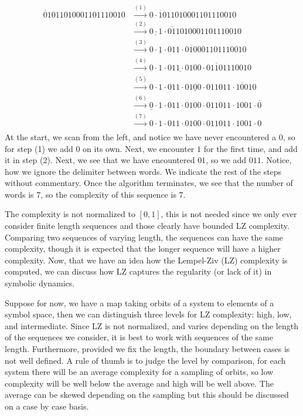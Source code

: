 \begin{align*}
\overline{0}1011010001101110010
&\xrightarrow{(1)}0\cdot\overline{1}011010001101110010 \\
&\xrightarrow{(2)}\underline{0\cdot1}\cdot\overline{01}1010001101110010 \\
&\xrightarrow{(3)}\underline{0\cdot1\cdot0}11\cdot\overline{010}001101110010 \\
&\xrightarrow{(4)}0\cdot1\cdot\underline{011\cdot01}00\cdot\overline{01101}110010 \\
&\xrightarrow{(5)}0\cdot1\cdot011\cdot0\underline{100}\cdot011011\cdot\overline{100}10 \\
&\xrightarrow{(6)}\underline{0}\cdot1\cdot011\cdot0100\cdot011011\cdot1001\cdot\overline{0} \\
&\xrightarrow{(7)}0\cdot1\cdot011\cdot0100\cdot011011\cdot1001\cdot0 \\
\end{align*}
At the start, we scan from the left, and notice we have never encountered a $0$, so for step (1) we add $0$ on its own. Next, we encounter $1$ for the first time, and add it in step (2). Next, we see that we have encountered $01$, so we add $011$. Notice, how we ignore the delimiter between words. We indicate the rest of the steps without commentary. Once the algorithm terminates, we see that the number of words is 7, so the complexity of this sequence is $7$.

The complexity is not normalized to $[0,1]$, this is not needed since we only ever consider finite length sequences and those clearly have bounded LZ complexity. Comparing two sequences of varying length, the sequences can have the same complexity, though it is expected that the longer sequence will have a higher complexity. Now, that we have an idea how the Lempel-Ziv (LZ) complexity is computed, we can discuss how LZ captures the regularity (or lack of it) in symbolic dynamics.

Suppose for now, we have a map taking orbits of a system to elements of a symbol space, then we can distinguish three levels for LZ complexity: high, low, and intermediate. Since LZ is not normalized, and varies depending on the length of the sequences we consider, it is best to work with sequences of the same length. Furthermore, provided we fix the length, the boundary between cases is not well defined. A rule of thumb is to judge the level by comparison, for each system there will be an average complexity for a sampling of orbits, so low complexity will be well below the average and high will be well above. The average can be skewed depending on the sampling but this should be discussed on a case by case basis.

